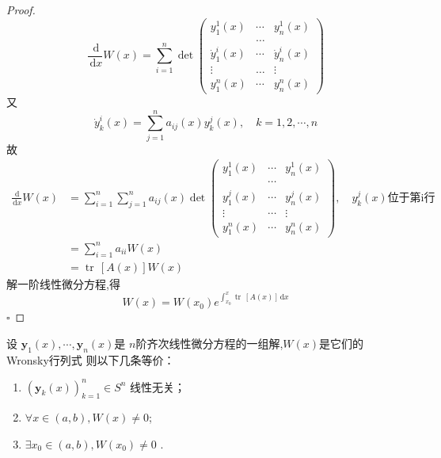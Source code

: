 \documentclass[lang=cn,12pt,color=green,fontset=none]{elegantbook}
\begin{document}
\begin{proof}
    $$
    \frac{\,\mathrm{d}  }{\,\mathrm{d} x } W\left( x \right) = \sum _{i=1}^{n} \det \begin{pmatrix} 
        y_1^{1}\left( x \right) &\cdots & y_{n}^{1}\left( x \right)\\ 
       &  \ldots  & \\ 
         \dot{y}_{1}^{i} \left( x \right) & \cdots  & \dot{y}_n^{i}\left( x \right) \\ 
       \vdots &  \ldots & \vdots\\ 
         y_{1}^{n}\left( x \right) & \cdots  & y_{n}^{n}\left( x \right)  
             
    \end{pmatrix}   
    $$又 $$
    \dot{y}^{i}_{k}\left( x \right) = \sum _{j=1}^{n} a_{ij}\left( x \right) y_{k}^{j}\left( x \right)   ,\quad  k=1,2,\cdots,n
    $$故 $$
     \begin{aligned}
        \frac{\,\mathrm{d}  }{\,\mathrm{d} x }W\left( x \right)&  = \sum _{i=1}^{n}\sum _{j=1}^{n} a_{ij}\left( x \right) \det  \begin{pmatrix}y_1^1\left(x\right) & \cdots & y_{n}^1\left(x\right)\\  & \cdots & \\ {y}_1^{j}\left(x\right) & \cdots & {y}_{n}^{j}\left(x\right)\\ \vdots & \cdots & \vdots\\ y_1^{n}\left(x\right) & \cdots & y_{n}^{n}\left(x\right)\end{pmatrix}
        ,\quad y_{k}^{j}\left( x \right)\text{位于第i行}\\ 
         & =   \sum _{i=1}^{n}a_{ii} W\left( x \right) \\ 
          & = \operatorname{tr}\,[A\left( x \right) ]W\left( x \right) 
     \end{aligned}
    $$ 
     解一阶线性微分方程,得 $$
     W\left( x \right) = W\left( x_0 \right) e^{\int_{x_0}^{x} \operatorname{tr}\,[A\left( x \right) ]\,\mathrm{d} x}  
     $$
    \hfill $\square$
\end{proof}

\begin{theorem}\label{thm:wronsky-inde}
    设 $ \mathbf{y}_{1}\left( x \right),\cdots ,\mathbf{y}_{n}\left( x \right)   $是 $ n $阶齐次线性微分方程的一组解,$ W\left( x \right)  $是它们的Wronsky行列式 则以下几条等价：
    \begin{enumerate}
        \item $ \left( \mathbf{y}_{k}\left( x \right)  \right)_{k=1}^{n} \in S^{n} $ 线性无关；
        \item  $ \forall x\in \left( a,b \right),W\left( x \right)\neq 0   $;
        \item $ \exists x_0 \in \left( a,b \right),W\left( x_0 \right)\neq 0   $  .
    \end{enumerate}
       
\end{theorem}
\end{document}
